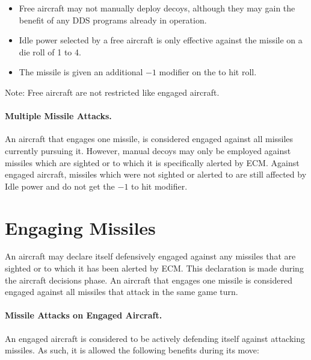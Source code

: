 {\begin{itemize}


    \item Free aircraft may not manually deploy decoys, although they may gain the benefit of any DDS programs already in operation.

    \item Idle power selected by a free aircraft is only effective against the missile on a die roll of 1 to 4.

    \item The missile is given an additional $-1$ modifier on the to hit roll.

\end{itemize}

Note: Free aircraft are not restricted like engaged aircraft.

\paragraph{Multiple Missile Attacks.} An aircraft that engages one missile, is considered engaged against all missiles currently pursuing it. However, manual decoys may only be employed against missiles which are sighted or to which it is specifically alerted by ECM. Against engaged aircraft, missiles which were not sighted or alerted to are still affected by Idle power and do not get the $-1$ to hit modifier.


}{

\section{Engaging Missiles}
\label{rule:engaging-missiles}

An aircraft may declare itself defensively engaged against any missiles that are sighted or to which it has been alerted by ECM. This declaration is made during the aircraft decisions phase. An aircraft that engages one missile is considered engaged against all missiles that attack in the same game turn. 


\paragraph{Missile Attacks on Engaged Aircraft.} An engaged aircraft is considered to be actively defending itself against attacking missiles. As such, it is allowed the following benefits during its move:

}
